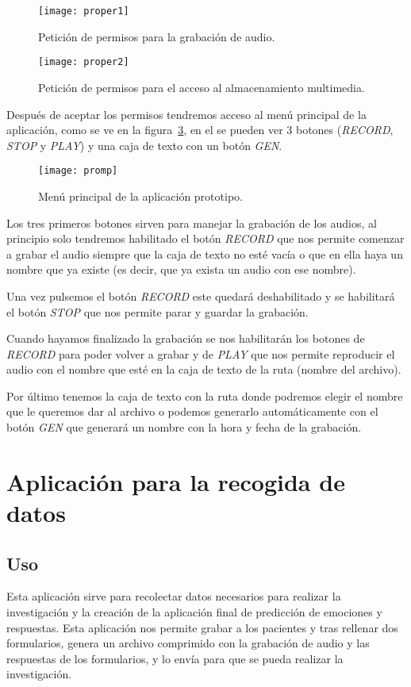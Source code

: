 \begin{figure}[htp]
	\centering
	\texttt{[image: proper1]}
	\caption{Petición de permisos para la grabación de audio.}
	\label{fig:properr1}
\end{figure}

\begin{figure}[htp]
	\centering
	\texttt{[image: proper2]}
	\caption{Petición de permisos para el acceso al almacenamiento multimedia.}
	\label{fig:proper2}
\end{figure}

Después de aceptar los permisos tendremos acceso al menú principal de la aplicación, como se ve en la figura~\ref{fig:promp}, en el se pueden ver 3 botones (\textit{RECORD}, \textit{STOP} y \textit{PLAY}) y una caja de texto con un botón \textit{GEN}.

\begin{figure}[htp]
	\centering
	\texttt{[image: promp]}
	\caption{Menú principal de la aplicación prototipo.}
	\label{fig:promp}
\end{figure}

Los tres primeros botones sirven para manejar la grabación de los audios, al principio solo tendremos habilitado el botón \textit{RECORD} que nos permite comenzar a grabar el audio siempre que la caja de texto no esté vacía o que en ella haya un nombre que ya existe (es decir, que ya exista un audio con ese nombre).

Una vez pulsemos el botón \textit{RECORD} este quedará deshabilitado y se habilitará el botón \textit{STOP} que nos permite parar y guardar la grabación.

Cuando hayamos finalizado la grabación se nos habilitarán los botones de \textit{RECORD} para poder volver a grabar y de \textit{PLAY} que nos permite reproducir el audio con el nombre que esté en la caja de texto de la ruta (nombre del archivo).

Por último tenemos la caja de texto con la ruta donde podremos elegir el nombre que le queremos dar al archivo o podemos generarlo automáticamente con el botón \textit{GEN} que generará un nombre con la hora y fecha de la grabación.
\section{Aplicación para la recogida de datos}
\subsection{Uso}
Esta aplicación sirve para recolectar datos necesarios para realizar la investigación y la creación de la aplicación final de predicción de emociones y respuestas. Esta aplicación nos permite grabar a los pacientes y tras rellenar dos formularios, genera un archivo comprimido con la grabación de audio y las respuestas de los formularios, y lo envía para que se pueda realizar la investigación.
